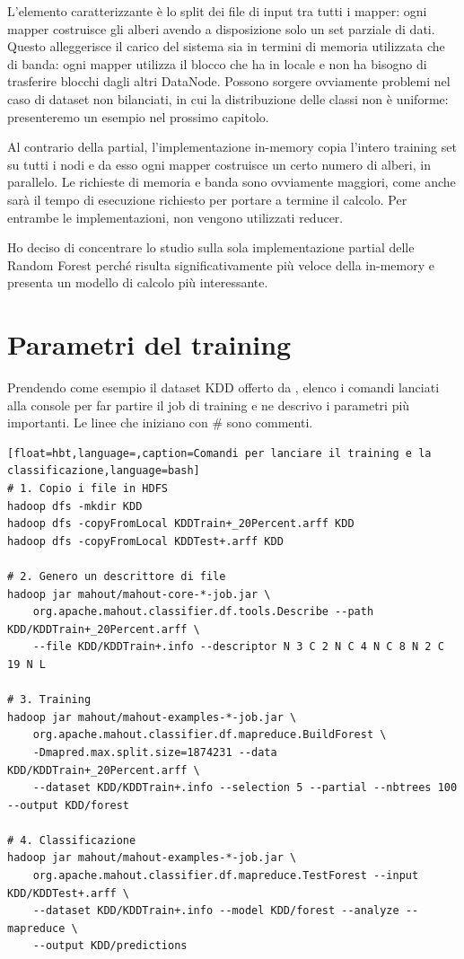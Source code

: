 \documentclass[a4paper,11pt,twoside,openright,fleqn]{book}
\begin{document}
L'elemento caratterizzante è lo split dei file di input tra tutti i mapper: ogni mapper costruisce gli alberi avendo a disposizione solo un set parziale di dati. Questo alleggerisce il carico del sistema sia in termini di memoria utilizzata che di banda: ogni mapper utilizza il blocco che ha in locale e non ha bisogno di trasferire blocchi dagli altri DataNode. Possono sorgere ovviamente problemi nel caso di dataset non bilanciati, in cui la distribuzione delle classi non è uniforme: presenteremo un esempio nel prossimo capitolo.

Al contrario della partial, l'implementazione in-memory copia l'intero training set su tutti i nodi e da esso ogni mapper costruisce un certo numero di alberi, in parallelo. Le richieste di memoria e banda sono ovviamente maggiori, come anche sarà il tempo di esecuzione richiesto per portare a termine il calcolo. Per entrambe le implementazioni, non vengono utilizzati reducer.

Ho deciso di concentrare lo studio sulla sola implementazione partial delle Random Forest perché risulta significativamente più veloce della in-memory e presenta un modello di calcolo più interessante.

\section{Parametri del training} \label{sec:parametri}

Prendendo come esempio il dataset KDD offerto da \cite{Bache+Lichman:2013}, elenco i comandi lanciati alla console per far partire il job di training e ne descrivo i parametri più importanti. Le linee che iniziano con \# sono commenti.

\begin{lstlisting}[float=hbt,language=,caption=Comandi per lanciare il training e la classificazione,language=bash]
# 1. Copio i file in HDFS
hadoop dfs -mkdir KDD
hadoop dfs -copyFromLocal KDDTrain+_20Percent.arff KDD
hadoop dfs -copyFromLocal KDDTest+.arff KDD

# 2. Genero un descrittore di file
hadoop jar mahout/mahout-core-*-job.jar \
	org.apache.mahout.classifier.df.tools.Describe --path KDD/KDDTrain+_20Percent.arff \
	--file KDD/KDDTrain+.info --descriptor N 3 C 2 N C 4 N C 8 N 2 C 19 N L

# 3. Training
hadoop jar mahout/mahout-examples-*-job.jar \
	org.apache.mahout.classifier.df.mapreduce.BuildForest \
	-Dmapred.max.split.size=1874231 --data KDD/KDDTrain+_20Percent.arff \
	--dataset KDD/KDDTrain+.info --selection 5 --partial --nbtrees 100 --output KDD/forest

# 4. Classificazione
hadoop jar mahout/mahout-examples-*-job.jar \
	org.apache.mahout.classifier.df.mapreduce.TestForest --input KDD/KDDTest+.arff \
	--dataset KDD/KDDTrain+.info --model KDD/forest --analyze --mapreduce \
	--output KDD/predictions
\end{lstlisting}
\end{document}
